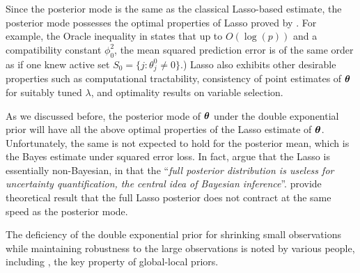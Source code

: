 \documentclass[11pt]{article}
\begin{document}
Since the posterior mode is the same as the classical Lasso-based estimate, the posterior mode possesses the optimal properties of Lasso proved by \cite{buhlmann2011statistics}. For example, the Oracle inequality in \citet[Eq. (2.8), Th. (6.1)]{buhlmann2011statistics} states that up to $O(\log(p))$ and a compatibility constant $\phi_0^2$, the mean squared prediction error is of the same order as if one knew active set $S_0 = \{j : \theta_j^0 \neq 0 \}$.)  Lasso also exhibits other desirable properties such as computational tractability, consistency of point estimates of $\boldsymbol{\theta}$ for suitably tuned $\lambda$, and optimality results on variable selection. 

As we discussed before, the posterior mode of $\boldsymbol{\theta}$ under the double exponential prior will have all the above optimal properties of the Lasso estimate of $\boldsymbol{\theta}$. Unfortunately, the same is not expected to hold for the posterior mean, which is the Bayes estimate under squared error loss. In fact, \citet{castillo2015bayesian} argue that the Lasso is essentially non-Bayesian, in that the ``\textsl{full posterior distribution is useless for uncertainty quantification, the central idea of Bayesian inference}''. \citet{castillo2015bayesian} provide theoretical result that the full Lasso posterior does not contract at the same speed as the posterior mode. 

The deficiency of the double exponential prior for shrinking small observations while maintaining robustness to the large observations is noted by various people, including \cite{polson2010shrink,datta2013asymptotic}, the key property of global-local priors. 

\end{document}
